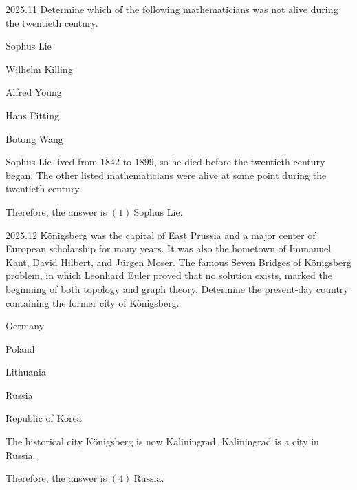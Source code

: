    \begin{pastproblem}{2025.11}
        Determine which of the following mathematicians was not alive during the twentieth century.
        \begin{problemchoices}
            \item Sophus Lie
            \item Wilhelm Killing
            \item Alfred Young
            \item Hans Fitting
            \item Botong Wang
        \end{problemchoices}
    \end{pastproblem}

    \begin{solution}
        Sophus Lie lived from $1842$ to $1899$, so he died before the twentieth century began. The
        other listed mathematicians were alive at some point during the twentieth century.

        Therefore, the answer is $\boxed{(1)\ \text{Sophus Lie}}$.
    \end{solution}

    \begin{pastproblem}{2025.12}
        K\"onigsberg was the capital of East Prussia and a major center of European scholarship for
        many years. It was also the hometown of Immanuel Kant, David Hilbert, and J\"urgen Moser.
        The famous Seven Bridges of K\"onigsberg problem, in which Leonhard Euler proved that no
        solution exists, marked the beginning of both topology and graph theory. Determine the
        present-day country containing the former city of K\"onigsberg.
        \begin{problemchoices}
            \item Germany
            \item Poland
            \item Lithuania
            \item Russia
            \item Republic of Korea
        \end{problemchoices}
    \end{pastproblem}

    \begin{solution}
        The historical city K\"onigsberg is now Kaliningrad. Kaliningrad is a city in Russia.

        Therefore, the answer is $\boxed{(4)\ \text{Russia}}$.
    \end{solution}

